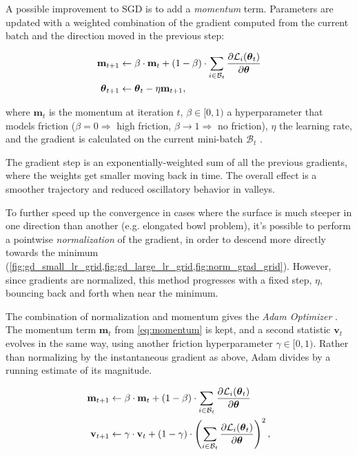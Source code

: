 A possible improvement to SGD is to add a \textit{momentum} term. Parameters are updated with a weighted combination of the gradient computed from the current batch and the direction moved in the previous step:

\begin{align}
    \mathbf{m}_{t+1} &\leftarrow \beta \cdot \mathbf{m}_t + (1-\beta) \cdot \sum_{i \in \mathcal{B}_t} \frac{\partial \mathcal{L}_i(\boldsymbol{\theta}_t)}{\partial \boldsymbol{\theta}} \notag \\
    \boldsymbol{\theta}_{t+1} &\leftarrow \boldsymbol{\theta}_t - \eta \mathbf{m}_{t+1},
    \label{eq:momentum}
\end{align}

where $\mathbf{m}_t$ is the momentum at iteration $t$, $\beta \in [0,1)$ a hyperparameter that models friction ($\beta = 0 \Rightarrow$ high friction, $\beta \rightarrow 1 \Rightarrow$ no friction), $\eta$ the learning rate, and the gradient is calculated on the current mini-batch $\mathcal{B}_t$ \cite{geron2022hands, prince2023understanding}.

The gradient step is an exponentially-weighted sum of all the previous gradients, where the weights get smaller moving back in time. The overall effect is a smoother trajectory and reduced oscillatory behavior in valleys.

To further speed up the convergence in cases where the surface is much steeper in one direction than another (e.g. elongated bowl problem), it's possible to perform a pointwise \textit{normalization} of the gradient, in order to descend more directly towards the minimum (\cref{fig:gd_small_lr_grid,fig:gd_large_lr_grid,fig:norm_grad_grid}). However, since gradients are normalized, this method progresses with a fixed step, $\eta$, bouncing back and forth when near the minimum.

The combination of normalization and momentum gives the \textit{Adam Optimizer} \cite{geron2022hands, prince2023understanding}. The momentum term $\mathbf{m}_t$ from \cref{eq:momentum} is kept, and a second statistic $\mathbf{v}_t$ evolves in the same way, using another friction hyperparameter $\gamma \in [0,1)$. Rather than normalizing by the instantaneous gradient as above, Adam divides by a running estimate of its magnitude.

\begin{align}
    \mathbf{m}_{t+1} &\leftarrow \beta \cdot \mathbf{m}_t + (1-\beta) \cdot \sum_{i \in \mathcal{B}_t} \frac{\partial \mathcal{L}_i(\boldsymbol{\theta}_t)}{\partial \boldsymbol{\theta}} \notag \\
    \mathbf{v}_{t+1} &\leftarrow \gamma \cdot \mathbf{v}_t + (1-\gamma) \cdot \left(\sum_{i \in \mathcal{B}_t} \frac{\partial \mathcal{L}_i(\boldsymbol{\theta}_t)}{\partial \boldsymbol{\theta}}\right)^2,
    \label{eq:adam_moments}
\end{align}

